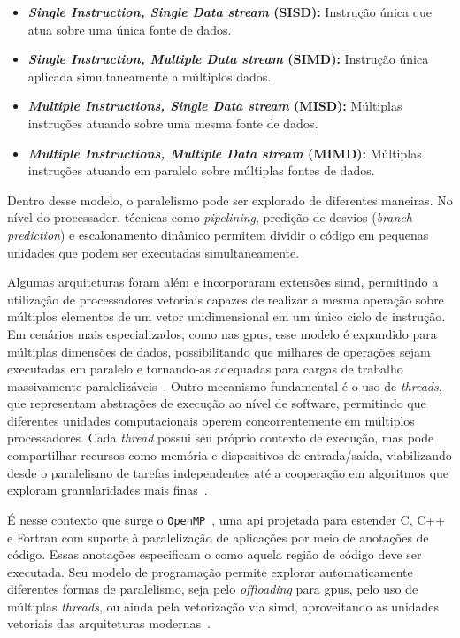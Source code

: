\begin{itemize}
    \item \textbf{\textit{Single Instruction, Single Data stream} (SISD):} Instrução única que atua sobre uma única fonte de dados.
    \item \textbf{\textit{Single Instruction, Multiple Data stream} (SIMD):} Instrução única aplicada simultaneamente a múltiplos dados.
    \item \textbf{\textit{Multiple Instructions, Single Data stream} (MISD):} Múltiplas instruções atuando sobre uma mesma fonte de dados.
    \item \textbf{\textit{Multiple Instructions, Multiple Data stream} (MIMD):} Múltiplas instruções atuando em paralelo sobre múltiplas fontes de dados.
\end{itemize}

Dentro desse modelo, o paralelismo pode ser explorado de diferentes maneiras. No nível do processador, técnicas como \textit{pipelining}, predição de desvios (\textit{branch prediction}) e escalonamento dinâmico permitem dividir o código em pequenas unidades que podem ser executadas simultaneamente.

Algumas arquiteturas foram além e incorporaram extensões \gls{simd}, permitindo a utilização de processadores vetoriais capazes de realizar a mesma operação sobre múltiplos elementos de um vetor unidimensional em um único ciclo de instrução. Em cenários mais especializados, como nas \glspl{gpu}, esse modelo é expandido para múltiplas dimensões de dados, possibilitando que milhares de operações sejam executadas em paralelo e tornando-as adequadas para cargas de trabalho massivamente paralelizáveis~\cite{hennessy2017}. Outro mecanismo fundamental é o uso de \textit{threads}, que representam abstrações de execução ao nível de software, permitindo que diferentes unidades computacionais operem concorrentemente em múltiplos processadores. Cada \textit{thread} possui seu próprio contexto de execução, mas pode compartilhar recursos como memória e dispositivos de entrada/saída, viabilizando desde o paralelismo de tarefas independentes até a cooperação em algoritmos que exploram granularidades mais finas~\cite{tanenbaum2015,hennessy2017}.

É nesse contexto que surge o \texttt{OpenMP}~\cite{openmpapi52}, uma \gls{api} projetada para estender C, C++ e Fortran com suporte à paralelização de aplicações por meio de anotações de código. Essas anotações especificam o como aquela região de código deve ser executada. Seu modelo de programação permite explorar automaticamente diferentes formas de paralelismo, seja pelo \textit{offloading} para \glspl{gpu}, pelo uso de múltiplas \textit{threads}, ou ainda pela vetorização via \gls{simd}, aproveitando as unidades vetoriais das arquiteturas modernas~\cite{mattson2019}.

